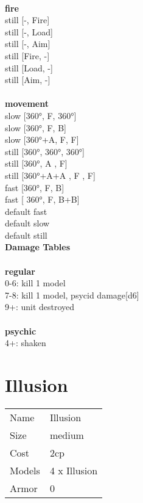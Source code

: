 \ \\ {\bf fire } \\
still [-, Fire] \\
still [-, Load] \\
still [-, Aim] \\
still [Fire, -] \\
still [Load, -] \\
still [Aim, -] \\
\ \\ {\bf movement } \\
slow [360°, F, 360°] \\
slow [360°, F, B] \\
slow [360°+A, F, F] \\
still [360°, 360°, 360°] \\
still [360°, A , F] \\
still [360°+A+A , F , F] \\
fast [360°, F, B] \\
fast [ 360°,  F, B+B] \\
default fast \\
default slow \\
default still \\


{\bf Damage Tables} \\
\ \\ {\bf regular } \\
0-6: kill 1 model \\
7-8: kill 1 model, psycid damage[d6] \\
9+: unit destroyed \\
\ \\ {\bf psychic } \\
4+: shaken \\










\pagebreak\pagebreak

\section{ Illusion }

\begin{tabular}{ll}
  Name & Illusion \\
  Size & medium\\
  Cost & 2cp\\
  Models & 4 x Illusion\\
  Armor & 0\\
\end{tabular}

